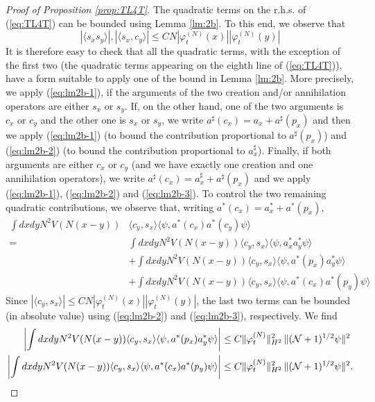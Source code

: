 \documentclass[11pt,a4paper]{article}
\newcommand{\cN}{{\cal N}}
\begin{document}
\begin{proof}[Proof of Proposition \ref{prop:TL4T}]
The quadratic terms on the r.h.s. of (\ref{eq:TL4T}) can be bounded using Lemma \ref{lm:2b}. To this end, we observe that
\[ |\langle s_x s_y \rangle| , |\langle s_x, c_y \rangle| \leq C N |\varphi^{(N)}_t (x)| |\varphi_t^{(N)} (y)| \]
It is therefore easy to check that all the quadratic terms, with the exception of the first two (the quadratic terms appearing on the eighth line of (\ref{eq:TL4T})), have a form suitable to apply one of the bound in Lemma \ref{lm:2b}. More precisely, we apply (\ref{eq:lm2b-1}), if the arguments of the two creation and/or annihilation operators are either $s_x$ or $s_y$. If, on the other hand, one of the two arguments is $c_x$ or $c_y$ and the other one is $s_x$ or $s_y$, we write $a^\sharp (c_x) = a_x + a^\sharp (p_x)$ and then we apply (\ref{eq:lm2b-1}) (to bound the contribution proportional to $a^\sharp (p_x)$) and (\ref{eq:lm2b-2}) (to bound the contribution proportional to $a_x^\sharp$). Finally, if both arguments are either $c_x$ or $c_y$ (and we have  exactly one creation and one annihilation operators), we write $a^\sharp (c_x) = a^\sharp_x + a^\sharp (p_x)$ and we apply (\ref{eq:lm2b-1}), (\ref{eq:lm2b-2}) and (\ref{eq:lm2b-3}). To control the two remaining quadratic contributions, we observe that, writing $a^* (c_x)= a^*_x + a^* (p_x)$,  
\begin{equation} \begin{split}\label{eq:4-2}  \int dx dy N^2 V(N (x-y)) & \langle c_y , s_x \rangle \langle \psi , a^* (c_x) a^* (c_y) \psi \rangle \\ =\; & \int dx dy N^2 V(N (x-y)) \langle c_y , s_x \rangle \langle \psi , a^*_x a^*_y \psi \rangle
\\ &+  \int dx dy N^2 V(N (x-y)) \langle c_y , s_x \rangle \langle \psi , a^* (p_x) a^*_y \psi\rangle
\\ &+  \int dx dy N^2 V(N (x-y)) \langle c_y , s_x \rangle \langle \psi , a^* (c_x) a^*(p_y) \psi \rangle \end{split} \end{equation}
Since $|\langle c_y , s_x \rangle| \leq C N |\varphi^{(N)}_t (x)| |\varphi^{(N)}_t (y)|$, the last two terms can be bounded (in absolute value) using (\ref{eq:lm2b-2}) and (\ref{eq:lm2b-3}), respectively. We find
\[ \begin{split}
\left|   \int dx dy N^2 V(N (x-y)) \langle c_y , s_x \rangle \langle \psi , a^* (p_x) a^*_y \psi\rangle \right| &\leq C \| \varphi_t^{(N)} \|_{H^2}^2 \,  \| (\cN+1)^{1/2} \psi \|^2 \\ 
\left|   \int dx dy N^2 V(N (x-y)) \langle c_y , s_x \rangle \langle \psi , a^* (c_x) a^* (p_y) \psi\rangle \right| &\leq C  \| \varphi_t^{(N)} \|_{H^2}^2 \, \| (\cN+1)^{1/2} \psi \|^2. 

\end{split}\]
\end{proof}
\end{document}

